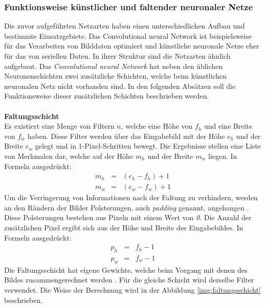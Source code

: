   \subsubsection{Funktionsweise künstlicher und faltender neuronaler Netze}\label{s.funktwknnundcnn}
Die zuvor aufgeführten Netzarten haben einen unterschiedlichen Aufbau und bestimmte Einsatzgebiete. Das Convolutional neural Network ist beispielsweise für das Verarbeiten von Bilddaten optimiert und künstliche neuronale Netze eher für das von seriellen Daten. In ihrer Struktur sind die Netzarten ähnlich aufgebaut. Das \textit{Convolutional neural Network} hat neben den üblichen Neuronenschichten zwei zusätzliche Schichten, welche beim künstlichen neuronalen Netz nicht vorhanden sind. In den folgenden Absätzen soll die Funktionsweise dieser zusätzlichen Schichten beschrieben werden.\\\\
\textbf{Faltungsschicht}\\
Es existiert eine Menge von Filtern $n$, welche eine Höhe von $f_{h}$ und eine Breite von $f_{w}$ haben. Diese Filter werden über das Eingabebild mit der Höhe $e_{h}$ und der Breite $e_{w}$ gelegt und in 1-Pixel-Schritten bewegt. Die Ergebnisse stellen eine Liste von Merkmalen dar, welche auf der Höhe $m_{h}$ und der Breite $m_{w}$ liegen. In Formeln ausgedrückt:
\begin{eqnarray} 
m_{h}&=&(e_{h} - f_{h})+1\\
m_{w}&=&(e_{w} - f_{w})+1
\end{eqnarray}
Um die Verringerung von Informationen nach der Faltung zu verhindern, werden an den Rändern der Bilder Polsterungen, auch \textit{padding} genannt, angehangen \cite[343]{goodfellow2016deep}. Diese Polsterungen bestehen aus Pixeln mit einem Wert von \textit{0}. Die Anzahl der zusätzlichen Pixel ergibt sich aus der Höhe und Breite des Eingabebildes. In Formeln ausgedrückt:
\begin{eqnarray}
p_{h}&=&f_{h} - 1\\
p_{w}&=&f_{w} - 1
\end{eqnarray}
Die Faltungsschicht hat eigene Gewichte, welche beim Vorgang mit denen des Bildes zusammengerechnet werden \cite[331ff.]{goodfellow2016deep}. Für die gleiche Schicht wird derselbe Filter verwendet. Die Weise der Berechnung wird in der Abbildung \ref{img:faltungsschicht}  beschrieben.
